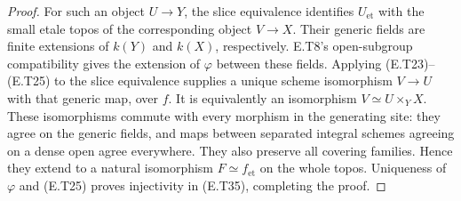 \begin{proof}
For such an object $U\to Y$, the slice equivalence identifies
$U_{\mathrm{et}}$ with the small etale topos of the
corresponding object $V\to X$.  Their generic fields are
finite extensions of $k(Y)$ and $k(X)$, respectively.
E.T8's open-subgroup compatibility gives the extension of
$\varphi$ between these fields.  Applying (E.T23)--(E.T25)
to the slice equivalence supplies a unique scheme
isomorphism $V\to U$ with that generic map, over $f$.
It is equivalently an isomorphism $V\simeq U\times_YX$.
These isomorphisms commute with every morphism in the
generating site: they agree on the generic fields, and
maps between separated integral schemes agreeing on a
dense open agree everywhere.  They also preserve all
covering families.  Hence they extend to a natural
isomorphism $F\simeq f_{\mathrm{et}}$ on the whole topos.
Uniqueness of $\varphi$ and (E.T25) proves injectivity in
(E.T35), completing the proof.
\end{proof}

